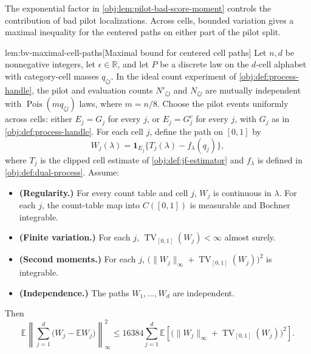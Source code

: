 \documentclass[11pt]{article}
\begin{document}
The exponential factor in \cref{obj:lem:pilot-bad-score-moment} controls the contribution of bad pilot localizations. Across cells, bounded variation gives a maximal inequality for the centered paths on either part of the pilot split.

\begin{lemmav}{lem:bv-maximal-cell-paths}[Maximal bound for centered cell paths]
Let \(n,d\) be nonnegative integers, let \(\epsilon\in\mathbb R\), and let \(P\) be a discrete law on the \(d\)-cell alphabet with category-cell masses \(q_{\zeta j}\). In the ideal count experiment of \cref{obj:def:process-handle}, the pilot and evaluation counts \(N'_{\zeta j}\) and \(N_{\zeta j}\) are mutually independent with \(\operatorname{Pois}(mq_{\zeta j})\) laws, where \(m=n/8\). Choose the pilot events uniformly across cells: either \(E_j=G_j\) for every \(j\), or \(E_j=G_j^c\) for every \(j\), with \(G_j\) as in \cref{obj:def:process-handle}. For each cell \(j\), define the path on \([0,1]\) by
\[
W_j(\lambda)=\mathbf 1_{E_j}\bigl\{T_j(\lambda)-f_\lambda(q_j)\bigr\},
\]
where \(T_j\) is the clipped cell estimate of \cref{obj:def:jf-estimator} and \(f_\lambda\) is defined in \cref{obj:def:dual-process}. Assume:

\begin{itemize}
\item \textbf{(Regularity.)} For every count table and cell \(j\), \(W_j\) is continuous in \(\lambda\). For each \(j\), the count-table map into \(C([0,1])\) is measurable and Bochner integrable.
\item \textbf{(Finite variation.)} For each \(j\), \(\operatorname{TV}_{[0,1]}(W_j)<\infty\) almost surely.
\item \textbf{(Second moments.)} For each \(j\), \(\bigl(\|W_j\|_\infty+\operatorname{TV}_{[0,1]}(W_j)\bigr)^2\) is integrable.
\item \textbf{(Independence.)} The paths \(W_1,\ldots,W_d\) are independent.
\end{itemize}

Then
\[
\mathbb E\left\|\sum_{j=1}^{d}\bigl(W_j-\mathbb EW_j\bigr)\right\|_\infty^2
\leq 16384\sum_{j=1}^{d}
\mathbb E\left[\bigl(\|W_j\|_\infty+\operatorname{TV}_{[0,1]}(W_j)\bigr)^2\right].
\]
\end{lemmav}
\end{document}
